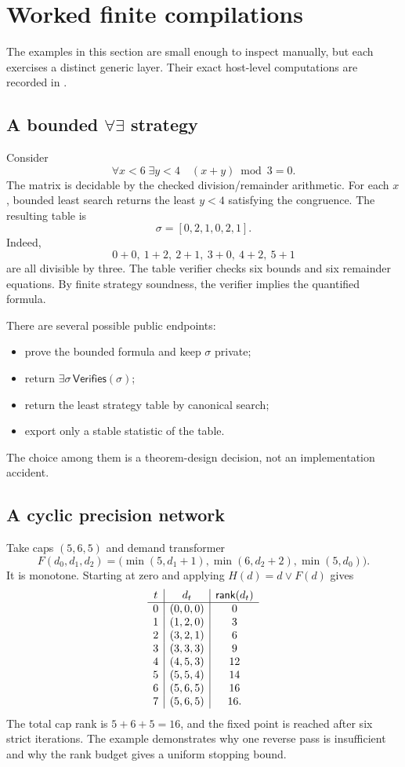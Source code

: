 \section{Worked finite compilations}

The examples in this section are small enough to inspect manually, but each exercises a distinct generic layer.  Their exact host-level computations are recorded in .

\subsection[A bounded forall-exists strategy]{A bounded \(\forall\exists\) strategy}

Consider
\[
  \forall x<6\;\exists y<4\quad (x+y)\bmod 3=0.
\]
The matrix is decidable by the checked division/remainder arithmetic.  For each \(x\), bounded least search returns the least \(y<4\) satisfying the congruence.  The resulting table is
\[
  \sigma=[0,2,1,0,2,1].
\]
Indeed,
\[
0+0,\ 1+2,\ 2+1,\ 3+0,\ 4+2,\ 5+1
\]
are all divisible by three.  The table verifier checks six bounds and six remainder equations.  By finite strategy soundness, the verifier implies the quantified formula.

There are several possible public endpoints:

\begin{itemize}
\item prove the bounded formula and keep \(\sigma\) private;
\item return \(\exists\sigma\,\mathsf{Verifies}(\sigma)\);
\item return the least strategy table by canonical search;
\item export only a stable statistic of the table.
\end{itemize}

The choice among them is a theorem-design decision, not an implementation accident.

\subsection{A cyclic precision network}

Take caps \((5,6,5)\) and demand transformer
\[
F(d_0,d_1,d_2)=
\bigl(\min(5,d_1+1),\min(6,d_2+2),\min(5,d_0)\bigr).
\]
It is monotone.  Starting at zero and applying \(H(d)=d\vee F(d)\) gives
\[
\begin{array}{c|c|c}
 t & d_t & \mathsf{rank}(d_t)\\
\hline
0&(0,0,0)&0\\
1&(1,2,0)&3\\
2&(3,2,1)&6\\
3&(3,3,3)&9\\
4&(4,5,3)&12\\
5&(5,5,4)&14\\
6&(5,6,5)&16\\
7&(5,6,5)&16.
\end{array}
\]
The total cap rank is \(5+6+5=16\), and the fixed point is reached after six strict iterations.  The example demonstrates why one reverse pass is insufficient and why the rank budget gives a uniform stopping bound.

